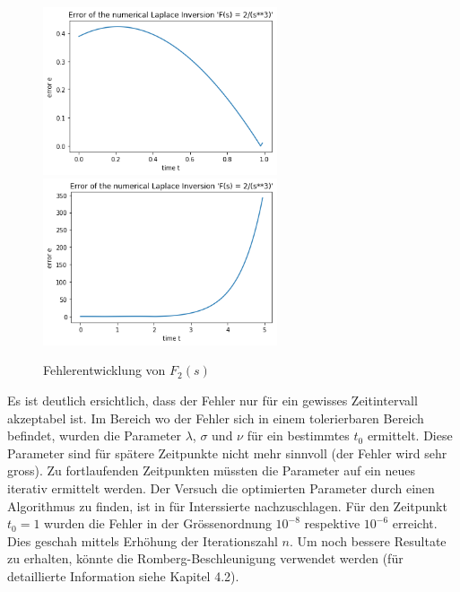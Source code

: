 
\begin{figure}
\centering
\includegraphics[width=6.9cm]{papers/laplace/Error_2divide_s_pow3}
\includegraphics[width=6.9cm]{papers/laplace/Error_2divide_s_pow3_bis_tgleich5}
\caption{Fehlerentwicklung von $F_{2}(s)$
\label{laplace:fehlerf2}
}
\end{figure}



Es ist deutlich ersichtlich, dass der Fehler nur für ein gewisses
Zeitintervall akzeptabel ist. Im Bereich wo der Fehler sich in einem
tolerierbaren Bereich befindet, wurden die Parameter $\lambda$,
$\sigma$ und $\nu$ für ein bestimmtes $t_{0}$ ermittelt.
Diese Parameter sind für spätere Zeitpunkte nicht mehr sinnvoll (der Fehler wird sehr gross). Zu fortlaufenden Zeitpunkten müssten die Parameter auf ein neues iterativ ermittelt werden. Der Versuch die optimierten Parameter durch einen Algorithmus zu finden, ist in \cite{laplace:talbot} für Interssierte nachzuschlagen. 
Für den Zeitpunkt $t_{0}=1$ wurden die Fehler in der Grössenordnung $10^{-8}$ respektive $10^{-6}$ erreicht. 
Dies geschah mittels Erhöhung der Iterationszahl $n$. Um noch bessere Resultate zu erhalten, könnte die Romberg-Beschleunigung verwendet werden (für detaillierte Information siehe Kapitel 4.2). 

